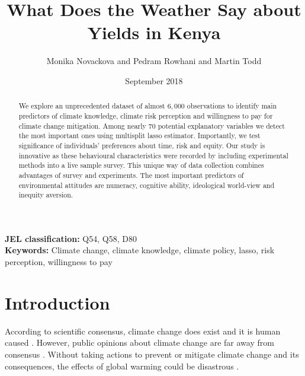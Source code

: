 \documentclass[a4paper,12pt]{article}
\date{\normalsize{September 2018}}
\title{\Large \bf What Does the Weather Say about Yields in Kenya}
\author{Monika Novackova and Pedram Rowhani and Martin Todd}
\affil{\small{Department of Geography, University of Sussex, Falmer, UK}}
\begin{document}
  

\makeatletter
\def\hlinewd#1{%
\noalign{\ifnum0=`}\fi\hrule \@height #1 %
\futurelet\reserved@a\@xhline}
\makeatother

\maketitle
\vfill

\doublespacing

\begin{abstract}
\noindent We explore an unprecedented dataset of almost $6,000$ observations to identify main predictors of climate knowledge, climate risk perception and willingness to pay for climate change mitigation. Among nearly $70$ potential explanatory variables we detect the most important ones using multisplit lasso estimator. Importantly, we test significance of individuals' preferences about time, risk and equity. Our study is innovative as these behavioural characteristics were recorded by including experimental methods into a live sample survey. This unique way of data collection combines advantages of survey and experiments. The most important predictors of environmental attitudes are numeracy, cognitive ability, ideological world-view and inequity aversion. \\
\end{abstract}


\noindent \textbf{JEL classification:} Q54, Q58, D80\\
\noindent \textbf{Keywords:} Climate change, climate knowledge, climate policy, lasso, risk perception, willingness to pay\\




\newpage
\sloppy


\section{Introduction}\label{Introduction}

According to scientific consensus, climate change does exist and it is human caused \citep{oreskes2004, mccarthy2001impacts, Cook2013COnsensus}. However, public opinions about climate change are far away from consensus \citep{leiserowitz2012, Pew2012}. Without taking actions to prevent or mitigate climate change and its consequences, the effects of global warming could be disastrous \citep{IPCC5WG1, IPCC5, Seneviratne2012}.
\end{document}
